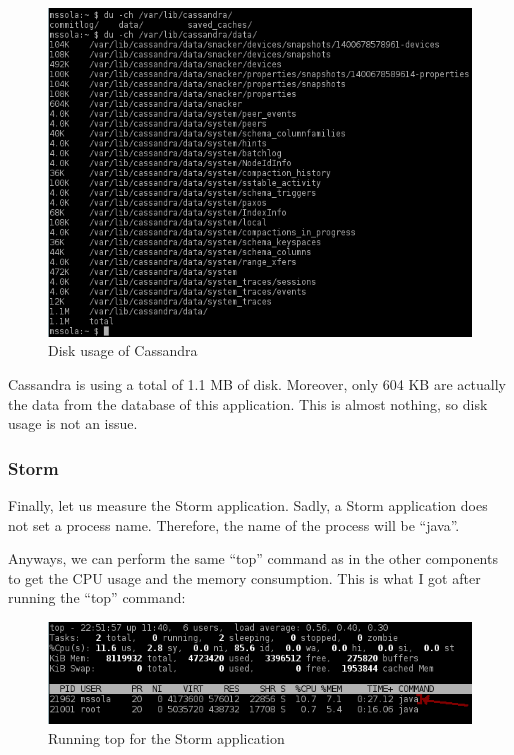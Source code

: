 \begin{figure}[H]
  \centering
  \includegraphics[scale=0.8]{hardware/images/cassandra-disk.png}
  \caption{Disk usage of Cassandra}\label{fig:top_disk}
\end{figure}

Cassandra is using a total of 1.1 MB of disk. Moreover, only 604 KB are
actually the data from the database of this application. This is almost
nothing, so disk usage is not an issue.

\subsubsection*{Storm}

Finally, let us measure the Storm application. Sadly, a Storm application does
not set a process name. Therefore, the name of the process will be ``java''.

Anyways, we can perform the same ``top'' command as in the other components to
get the CPU usage and the memory consumption. This is what I got after running
the ``top'' command:

\begin{figure}[H]
  \centering
  \includegraphics[scale=0.8]{hardware/images/storm.png}
  \caption{Running top for the Storm application}\label{fig:top_storm}
\end{figure}

